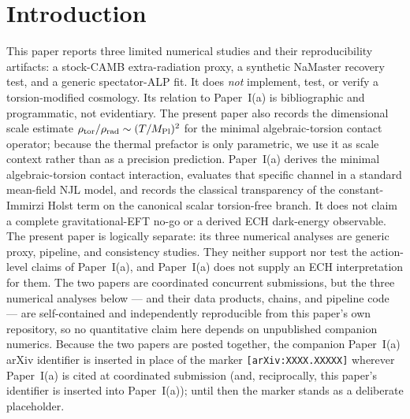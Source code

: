 \documentclass[aps,prd,twocolumn,superscriptaddress,showpacs,preprintnumbers,nofootinbib,longbibliography,floatfix]{revtex4-2}
\begin{document}
\section{Introduction}\label{sec:intro}

This paper reports three limited numerical studies and their reproducibility
artifacts: a stock-CAMB extra-radiation proxy, a synthetic NaMaster recovery
test, and a generic spectator-ALP fit.  It does \emph{not} implement, test, or
verify a torsion-modified cosmology.  Its relation to Paper~I(a) is bibliographic
and programmatic, not evidentiary.  The present paper also records the
dimensional scale estimate $\rho_{\rm tor}/\rho_{\rm rad}\sim
(T/M_{\rm Pl})^2$ for the minimal algebraic-torsion contact operator; because
the thermal prefactor is only parametric, we use it as scale context rather
than as a precision prediction.
Paper~I(a) derives the minimal algebraic-torsion contact interaction, evaluates
that specific channel in a standard mean-field NJL model, and records the
classical transparency of the constant-Immirzi Holst term on the canonical
scalar torsion-free branch.  It does not claim a complete gravitational-EFT
no-go or a derived ECH dark-energy observable.  The present paper is logically
separate: its three numerical analyses are generic proxy, pipeline, and
consistency studies.  They neither support nor test the action-level claims of
Paper~I(a), and Paper~I(a) does not supply an ECH interpretation for them.
The two papers are coordinated concurrent submissions, but the three numerical
analyses below --- and their data products, chains, and pipeline code --- are
self-contained and independently reproducible from this paper's own repository,
so no quantitative claim here depends on unpublished companion numerics.
Because the two papers are posted together, the companion Paper~I(a) arXiv
identifier is inserted in place of the marker \mbox{\texttt{[arXiv:XXXX.XXXXX]}}
wherever Paper~I(a) is cited at coordinated submission (and, reciprocally, this
paper's identifier is inserted into Paper~I(a)); until then the marker stands as
a deliberate placeholder.
\end{document}
